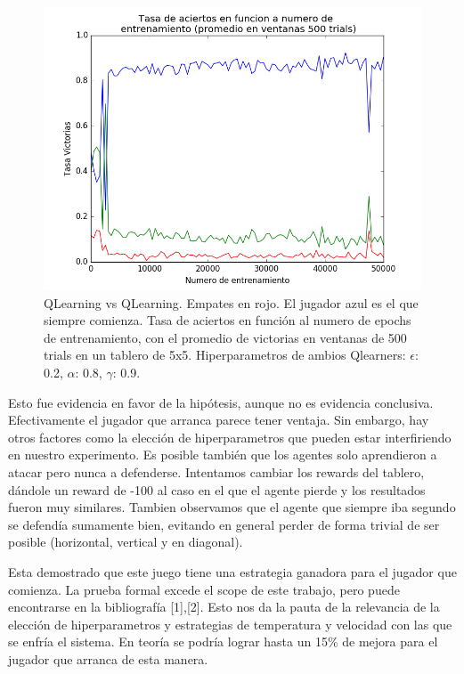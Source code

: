 \documentclass[10pt,a4paper]{article}
\begin{document}
\begin{figure}[H]
\centering
\includegraphics[scale=0.6]{images/qvsq_arranca.png}
\caption{QLearning vs QLearning. Empates en rojo. El jugador azul es el que siempre comienza. Tasa de aciertos en función al numero de epochs de entrenamiento, con el promedio de victorias en ventanas de 500 trials en un tablero de 5x5. Hiperparametros de ambios Qlearners: $\epsilon$: 0.2, $\alpha$: 0.8, $\gamma$: 0.9.}
\end{figure}

Esto fue evidencia en favor de la hipótesis, aunque no es evidencia conclusiva. Efectivamente el jugador que arranca parece tener ventaja. Sin embargo, hay otros factores como la elección de hiperparametros que pueden estar interfiriendo en nuestro experimento. Es posible también que los agentes solo aprendieron a atacar pero nunca a defenderse. Intentamos cambiar los rewards del tablero, dándole un reward de -100 al caso en el que el agente pierde y los resultados fueron muy similares. Tambien observamos que el agente que siempre iba segundo se defendía sumamente bien, evitando en general perder de forma trivial de ser posible (horizontal, vertical y en diagonal).

Esta demostrado que este juego tiene una estrategia ganadora para el jugador que comienza. La prueba formal excede el scope de este trabajo, pero puede encontrarse en la bibliografía [1],[2]. Esto nos da la pauta de la relevancia de la elección de hiperparametros y estrategias de temperatura y velocidad con las que se enfría el sistema. En teoría se podría lograr hasta un 15\% de mejora para el jugador que arranca de esta manera.
\end{document}

